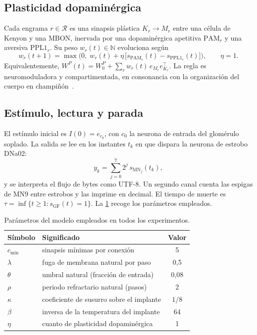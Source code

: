 \documentclass[11pt,a4paper]{article}
\theoremstyle{plain}
\theoremstyle{definition}
\theoremstyle{remark}
\newcommand{\PAM}{\mathrm{PAM}}
\newcommand{\PPL}{\mathrm{PPL1}}
\newcommand{\GF}{\mathrm{GF}}
\newcommand{\N}{\mathbb{N}}
\begin{document}
\subsection{Plasticidad dopaminérgica}

Cada engrama $r\in\mathcal R$ es una sinapsis plástica $K_r\to M_r$ entre una
célula de Kenyon y una MBON, inervada por una dopaminérgica apetitiva
$\PAM_r$ y una aversiva $\PPL_r$. Su peso $w_r(t)\in\N$ evoluciona según
\begin{equation}
  w_r(t+1) = \max\!\Big(0,\; w_r(t) + \eta\,\big[s_{\PAM_r}(t) - s_{\PPL_r}(t)\big]\Big),
  \qquad \eta = 1 .
  \label{eq:plasticidad}
\end{equation}
Equivalentemente, $W^P(t) = W^P_0 + \sum_r w_r(t)\, e_{M_r}e_{K_r}^{\!\top}$.
La regla es neuromoduladora y compartimentada, en consonancia con la
organización del cuerpo en champiñón~\cite{aso2014,cohn2015,hige2015}.

\subsection{Estímulo, lectura y parada}

El estímulo inicial es $I(0)=e_{c_0}$, con $c_0$ la neurona de entrada del
glomérulo soplado. La salida se lee en los instantes $t_k$ en que dispara la
neurona de estrobo DNa02:
\begin{equation}
  y_k = \sum_{j=0}^{7} 2^{j}\, s_{\mathrm{MN}_j}(t_k),
  \label{eq:byte}
\end{equation}
y se interpreta el flujo de bytes como UTF-8. Un segundo canal cuenta las
espigas de MN9 entre estrobos y las imprime en decimal. El tiempo de muerte es
$\tau=\inf\{t\ge1: s_{\GF}(t)=1\}$. La \cref{tab:parametros} recoge los
parámetros empleados.

\begin{table}[t]
\centering
\caption{Parámetros del modelo empleados en todos los experimentos.}
\label{tab:parametros}
\begin{tabular}{llc}
\toprule
Símbolo & Significado & Valor \\
\midrule
$c_{\min}$ & sinapsis mínimas por conexión & 5 \\
$\lambda$  & fuga de membrana natural por paso & 0,5 \\
$\theta$   & umbral natural (fracción de entrada) & 0,08 \\
$\rho$     & periodo refractario natural (pasos) & 2 \\
$\kappa$   & coeficiente de susurro sobre el implante & $1/8$ \\
$\beta$    & inversa de la temperatura del implante & 64 \\
$\eta$     & cuanto de plasticidad dopaminérgica & 1 \\
\bottomrule
\end{tabular}
\end{table}
\end{document}
